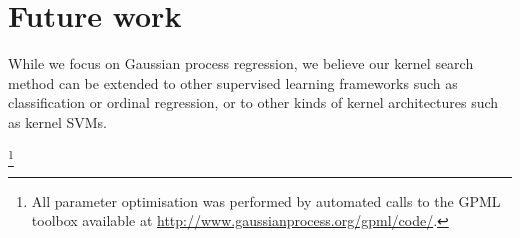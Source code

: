 \section{Future work}

While we focus on Gaussian process regression, we believe our kernel search method can be extended to other supervised learning frameworks such as classification or ordinal regression, or to other kinds of kernel architectures such as kernel SVMs.


\footnote{
All \gp{} parameter optimisation was performed by automated calls to the GPML toolbox available at \url{http://www.gaussianprocess.org/gpml/code/}.}



\outbpdocument{


}





\iffalse


